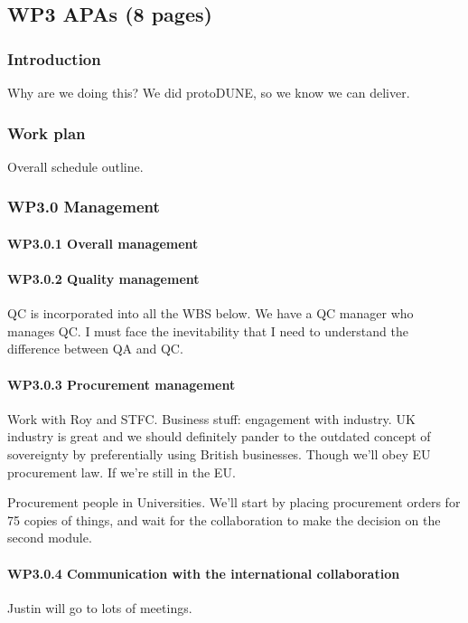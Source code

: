 \subsection{WP3 APAs (8 pages)}

\subsubsection{Introduction}

Why are we doing this?
We did protoDUNE, so we know we can deliver.


\subsubsection{Work plan}

Overall schedule outline.

\subsubsection{WP3.0 Management}
\paragraph{WP3.0.1 Overall management}
\paragraph{WP3.0.2 Quality management}
QC is incorporated into all the WBS below.
We have a QC manager who manages QC.
I must face the inevitability that I need to understand the difference between QA and QC.

\paragraph{WP3.0.3 Procurement management}
Work with Roy and STFC. Business stuff: engagement with industry. UK industry is great and we should definitely pander to the outdated concept of sovereignty by preferentially using British businesses. Though we'll obey EU procurement law. If we're still in the EU.

Procurement people in Universities.
We'll start by placing procurement orders for 75 copies of things, and wait for the collaboration to make the decision on the second module.

\paragraph{WP3.0.4 Communication with the international collaboration}
Justin will go to lots of meetings.


